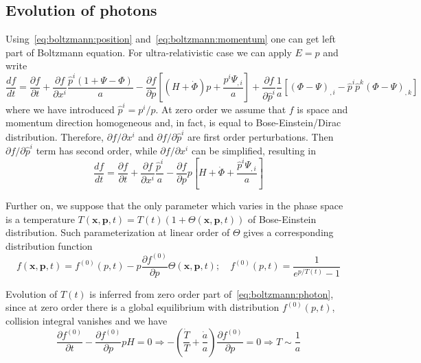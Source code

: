 \documentclass[12pt]{extarticle}
\numberwithin{problem}{section}
\numberwithin{theorem}{section}
\begin{document}
	\subsection{Evolution of photons}
	Using~\ref{eq:boltzmann:position} and~\ref{eq:boltzmann:momentum} one can get left part of Boltzmann equation. For ultra-relativistic case we can apply $E = p$ and write
	\begin{equation}
		\label{eq:boltzmann:photon}
		\frac{df}{dt} = \frac{\partial f}{\partial t} + \frac{\partial f}{\partial x^i}\frac{\hat{p}^i(1 + \Psi - \Phi)}{a} - \frac{\partial f}{\partial p}\left[(H + \dot{\Phi})p + \frac{p^i\Psi_{,i}}{a}\right] + \frac{\partial f}{\partial \hat{p}^i}\frac{1}{a}\left[(\Phi - \Psi)_{,i} - \hat{p}^i\hat{p}^k(\Phi - \Psi)_{,k}\right]
	\end{equation}
	where we have introduced $\hat{p}^i = p^i / p$. At zero order we assume that $f$ is space and momentum direction homogeneous and, in fact, is equal to Bose-Einstein/Dirac distribution. Therefore, $\partial f/\partial x^i$ and $\partial f/\partial \hat{p}^i$ are first order perturbations. Then $\partial f/\partial\hat{p}^i$ term has second order, while $\partial f/\partial x^i$ can be simplified, resulting in
	\begin{equation}
		\label{eq:boltzmann:photon-left}
		\frac{df}{dt} = \frac{\partial f}{\partial t} + \frac{\partial f}{\partial x^i}\frac{\hat{p}^i}{a} - \frac{\partial f}{\partial p}p\left[H + \dot{\Phi} + \frac{\hat{p}^i\Psi_{,i}}{a}\right]
	\end{equation}

	Further on, we suppose that the only parameter which varies in the phase space is a temperature $T(\mathbf{x}, \mathbf{p}, t) = T(t)(1 + \Theta(\mathbf{x}, \mathbf{p}, t))$ of Bose-Einstein distribution. Such parameterization at linear order of $\Theta$ gives a corresponding distribution function
	\begin{equation}
		f(\mathbf{x}, \mathbf{p}, t) = f^{(0)}(p, t) - p\frac{\partial f^{(0)}}{\partial p}\Theta(\mathbf{x}, \mathbf{p}, t);\quad f^{(0)}(p, t) = \frac{1}{e^{p / T(t)} - 1}
	\end{equation} 

	Evolution of $T(t)$ is inferred from zero order part of~\ref{eq:boltzmann:photon}, since at zero order there is a global equilibrium with distribution $f^{(0)}(p, t)$, collision integral vanishes and we have
	\begin{equation}
		\frac{\partial f^{(0)}}{\partial t} - \frac{\partial f^{(0)}}{\partial p}pH = 0\Rightarrow -\left(\frac{\dot{T}}{T} + \frac{\dot{a}}{a}\right)\frac{\partial f^{(0)}}{\partial p} = 0\Rightarrow T\sim\frac{1}{a}
	\end{equation}
\end{document}
